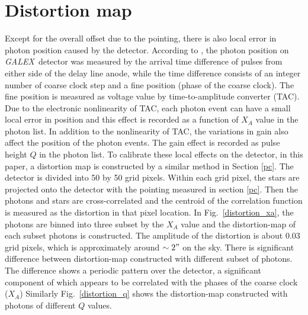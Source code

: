 \documentclass[12pt, preprint]{aastex}
\newcommand{\project}[1]{\textsl{#1}}
\newcommand{\galex}{\project{GALEX}}
\begin{document}
\section{Distortion map}
\label{dm}
Except for the overall offset due to the pointing, there is also local error in photon position caused by the detector. 
According to \cite{galex_cal}, the photon position on \galex\ detector was measured by the arrival time difference of pulses from either side of the delay line anode, while the time difference consists of an integer number of coarse clock step and a fine position (phase of the coarse clock).
The fine position is measured as voltage value by time-to-amplitude converter (TAC).
Due to the electronic nonlinearity of TAC, each photon event can have a small local error in position and this effect is recorded as a function of $X_A$ value in the photon list.
In addition to the nonlinearity of TAC, the variations in gain also affect the position of the photon events.
The gain effect is recorded as pulse height $Q$ in the photon list.
To calibrate these local effects on the detector, in this paper, a distortion map is constructed by a similar method in Section \ref{pc}.  
The detector is divided into 50 by 50 grid pixels. 
Within each grid pixel, the stars are projected onto the detector with the pointing measured in section \ref{pc}.
Then the photons and stars are cross-correlated and the centroid of the correlation function is measured as the distortion in that pixel location.
In Fig.~\ref{distortion_xa}, the photons are binned into three subset by the $X_A$ value and the distortion-map of each subset photons is constructed.
The amplitude of the distortion is about 0.03 grid pixels, which is approximately around $\sim 2"$ on the sky.
There is significant difference between distortion-map constructed with different subset of photons.
The difference shows a periodic pattern over the detector, a significant component of which appears to be correlated with the phases of the coarse clock ($X_A$)
Similarly Fig.~\ref{distortion_q} shows the distortion-map constructed with photons of different $Q$ values.
\end{document}
